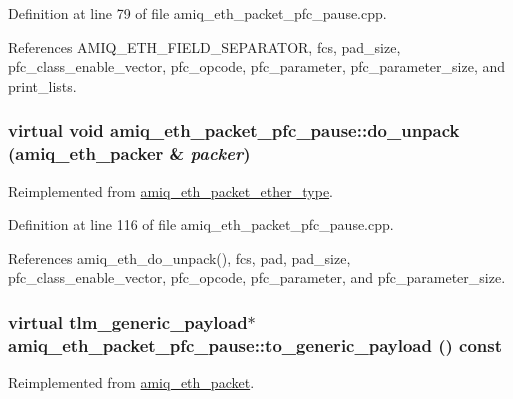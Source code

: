Definition at line 79 of file amiq\_\-eth\_\-packet\_\-pfc\_\-pause.cpp.

References AMIQ\_\-ETH\_\-FIELD\_\-SEPARATOR, fcs, pad\_\-size, pfc\_\-class\_\-enable\_\-vector, pfc\_\-opcode, pfc\_\-parameter, pfc\_\-parameter\_\-size, and print\_\-lists.\hypertarget{classamiq__eth__packet__pfc__pause_abc86009030a38ab03469c697ffec73f6}{
\subsubsection[{do\_\-unpack}]{\setlength{\rightskip}{0pt plus 5cm}virtual void amiq\_\-eth\_\-packet\_\-pfc\_\-pause::do\_\-unpack ({\bf amiq\_\-eth\_\-packer} \& {\em packer})}}
\label{classamiq__eth__packet__pfc__pause_abc86009030a38ab03469c697ffec73f6}


Reimplemented from \hyperlink{classamiq__eth__packet__ether__type_a0c86ef80c46bbed384739b23e5efb0ef}{amiq\_\-eth\_\-packet\_\-ether\_\-type}.

Definition at line 116 of file amiq\_\-eth\_\-packet\_\-pfc\_\-pause.cpp.

References amiq\_\-eth\_\-do\_\-unpack(), fcs, pad, pad\_\-size, pfc\_\-class\_\-enable\_\-vector, pfc\_\-opcode, pfc\_\-parameter, and pfc\_\-parameter\_\-size.\hypertarget{classamiq__eth__packet__pfc__pause_aaf46b734371ab160eba8764a4e398516}{
\subsubsection[{to\_\-generic\_\-payload}]{\setlength{\rightskip}{0pt plus 5cm}virtual tlm\_\-generic\_\-payload$\ast$ amiq\_\-eth\_\-packet\_\-pfc\_\-pause::to\_\-generic\_\-payload () const}}
\label{classamiq__eth__packet__pfc__pause_aaf46b734371ab160eba8764a4e398516}


Reimplemented from \hyperlink{classamiq__eth__packet_a6dd92751d8172eeaa347d71bb415b0d5}{amiq\_\-eth\_\-packet}.

